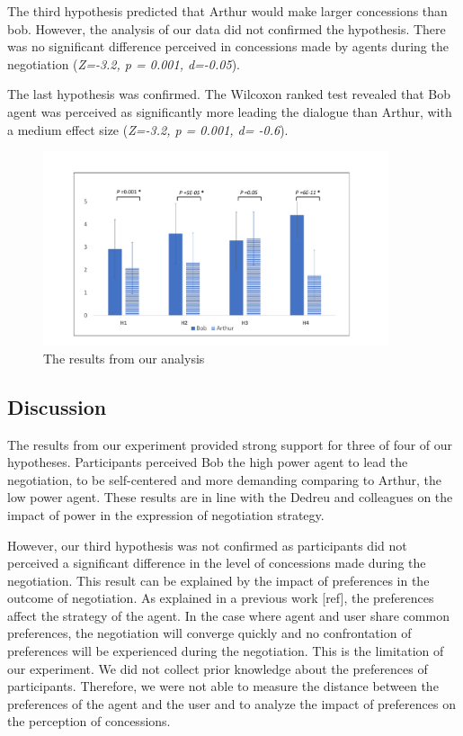 \documentclass[runningheads,a4paper]{llncs}
\begin{document}
		The third hypothesis predicted that Arthur would make larger concessions than bob. However, the analysis of our data did not confirmed the hypothesis. There was no significant difference perceived in concessions made by agents during the negotiation (\emph{Z=-3.2, p = 0.001, d=-0.05}).
		
		The last hypothesis was confirmed. The Wilcoxon ranked test revealed that Bob agent was perceived as significantly more leading the dialogue than Arthur, with a medium effect size (\emph{Z=-3.2, p = 0.001, d= -0.6}).
			\vspace{-.9em}  
			\begin{figure}[h]
				\centering
				\includegraphics[width=4in]{graphs/res.pdf}
				\caption{The results from our analysis}
				\label{res}
			\end{figure}
			\vspace{-.5em} 
		\subsection{Discussion}
		The results from our experiment provided strong support for three of four of our hypotheses. Participants perceived Bob the high power agent to lead the negotiation, to be self-centered and more demanding comparing to Arthur, the low power agent. These results are in line with the Dedreu and colleagues on the impact of power in the expression of negotiation strategy.  
		
		However, our third hypothesis was not confirmed as participants did not perceived a significant difference in the level of concessions made during the negotiation. This result can be explained by the impact of preferences in the outcome of negotiation. As explained in a previous work [ref], the preferences affect the strategy of the agent. In the case where agent and user share common preferences, the negotiation will converge quickly and no confrontation of preferences will be experienced during the negotiation. This is the limitation of our experiment. We did not collect prior knowledge about the preferences of participants. Therefore, we were not able to measure the distance between the preferences of the agent and the user and to analyze the impact of preferences on the perception of concessions.
		
\end{document}
